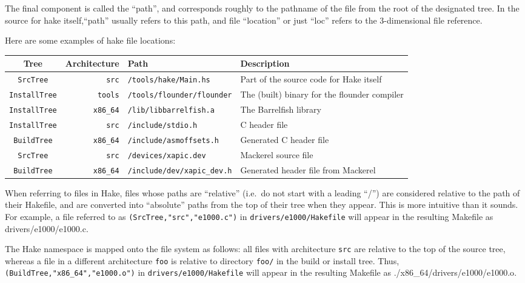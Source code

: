 \documentclass[a4paper,twoside]{report} %
\begin{document}
The final component is called the ``path'', and corresponds roughly
to the pathname of the file from the root of the designated tree.
In the source for hake itself,``path'' usually refers to this path,
and file ``location'' or just ``loc'' refers to the 3-dimensional file
reference.

Here are some examples of hake file locations:

\begin{tabular}{crll} Tree & Architecture & Path & Description \\ \hline
\texttt{SrcTree} & \texttt{src} & \texttt{/tools/hake/Main.hs} & Part of the source code for Hake
itself \\
\texttt{InstallTree} & \texttt{tools} & \texttt{/tools/flounder/flounder} & The (built) binary for the
flounder compiler \\
\texttt{InstallTree} & \texttt{x86\_64} & \texttt{/lib/libbarrelfish.a} & The Barrelfish
library \\
\texttt{InstallTree} & \texttt{src} & \texttt{/include/stdio.h} & C header file \\
\texttt{BuildTree} & \texttt{x86\_64} & \texttt{/include/asmoffsets.h} & Generated C header
file \\
\texttt{SrcTree} & \texttt{src} & \texttt{/devices/xapic.dev} & Mackerel source file \\
\texttt{BuildTree} & \texttt{x86\_64} &
\texttt{/include/dev/xapic\_dev.h} & Generated header file from Mackerel \\
\end{tabular}

When referring to files in Hake, files whose paths are ``relative''
(i.e.\ do not start with a leading ``/'') are considered relative to
the path of their Hakefile, and are converted into
``absolute'' paths from the top of their tree when they appear.
This is more intuitive than it sounds.  For example, a file referred
to as \texttt{(SrcTree,"src","e1000.c")} in
\texttt{drivers/e1000/Hakefile} will appear in the resulting Makefile
as {drivers/e1000/e1000.c}.

The Hake namespace is mapped onto the file system as follows: all
files with architecture \texttt{src} are relative to the top of the
source tree, whereas a file in a different architecture \texttt{foo}
is relative to directory \texttt{foo/} in the build or install tree.
Thus, \texttt{(BuildTree,"x86\_64","e1000.o")} in
\texttt{drivers/e1000/Hakefile} will  appear in the resulting Makefile
as {./x86\_64/drivers/e1000/e1000.o}.
\end{document}
